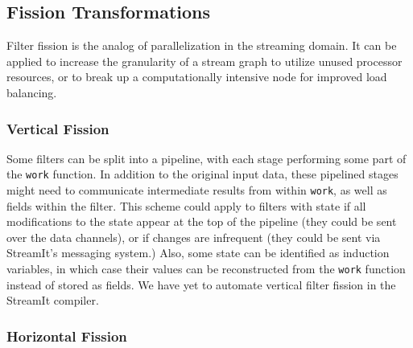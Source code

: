 \subsection{Fission Transformations}

Filter fission is the analog of parallelization in the streaming
domain.  It can be applied to increase the granularity of a stream
graph to utilize unused processor resources, or to break up a
computationally intensive node for improved load balancing.

\subsubsection{Vertical Fission}

Some filters can be split into a pipeline, with each stage performing
some part of the {\tt work} function.  In addition to the original
input data, these pipelined stages might need to communicate
intermediate results from within {\tt work}, as well as fields within
the filter.  This scheme could apply to filters with state if all
modifications to the state appear at the top of the pipeline (they
could be sent over the data channels), or if changes are infrequent
(they could be sent via StreamIt's messaging system.)  Also, some
state can be identified as induction variables, in which case their
values can be reconstructed from the {\tt work} function instead of
stored as fields.  We have yet to automate vertical filter fission in
the StreamIt compiler.

\subsubsection{Horizontal Fission}

